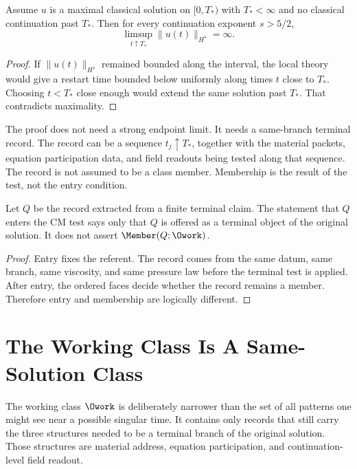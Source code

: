 \begin{lemma}
Assume \(u\) is a maximal classical solution on \([0,T_*)\) with \(T_*<\infty\) and no classical continuation past \(T_*\).
Then for every continuation exponent \(s>5/2\),
\[
  \limsup_{t\uparrow T_*}\|u(t)\|_{H^s}=\infty .
\]
\end{lemma}

\begin{proof}
If \(\|u(t)\|_{H^s}\) remained bounded along the interval, the local theory would give a restart time bounded below uniformly along times \(t\) close to \(T_*\).
Choosing \(t<T_*\) close enough would extend the same solution past \(T_*\).
That contradicts maximality.
\end{proof}

The proof does not need a strong endpoint limit.
It needs a same-branch terminal record.
The record can be a sequence \(t_j\uparrow T_*\), together with the material packets, equation participation data, and field readouts being tested along that sequence.
The record is not assumed to be a class member.
Membership is the result of the test, not the entry condition.

\begin{lemma}
Let \(Q\) be the record extracted from a finite terminal claim.
The statement that \(Q\) enters the CM test says only that \(Q\) is offered as a terminal object of the original solution.
It does not assert \(\Member(Q;\Owork)\).
\end{lemma}

\begin{proof}
Entry fixes the referent.
The record comes from the same datum, same branch, same viscosity, and same pressure law before the terminal test is applied.
After entry, the ordered faces decide whether the record remains a member.
Therefore entry and membership are logically different.
\end{proof}

\section{The Working Class Is A Same-Solution Class}

The working class \(\Owork\) is deliberately narrower than the set of all patterns one might see near a possible singular time.
It contains only records that still carry the three structures needed to be a terminal branch of the original solution.
Those structures are material address, equation participation, and continuation-level field readout.

